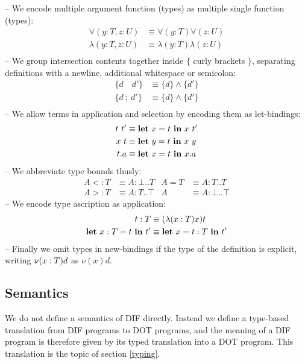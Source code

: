 \noindent -- We encode multiple argument function (types) as multiple single
function (types):
\begin{align*}
    \forall(y: T, z: U) &\equiv \forall(y: T)\forall(z: U) \\
    \lambda(y: T, z: U) &\equiv \lambda(y: T)\lambda(z: U) \\
\end{align*}
\noindent -- We group intersection contents together inside $\{$ curly brackets
$\}$, separating definitions with a newline, additional whitespace or semicolon:
\begin{align*}
    \{d \quad d'\} &\equiv \{d\} \wedge \{d'\} \\
    \{d \ ;\  d'\} &\equiv \{d\} \wedge \{d'\} \\
\end{align*}
\noindent -- We allow terms in application and selection by encoding them as
let-bindings:
\begin{align*}
    t\ t' &\equiv \textbf{let}\ x = t\ \textbf{in}\ x\ t' \\
    x\ t &\equiv \textbf{let}\ y = t\ \textbf{in}\ x\ y \\
    t.a &\equiv \textbf{let}\ x = t\ \textbf{in}\ x.a
\end{align*}
\noindent -- We abbreviate type bounds thusly:
\begin{align*}
    A <: T &\equiv A: \bot..T & A = T &\equiv A: T..T \\
    A >: T &\equiv A: T..\top & A &\equiv A: \bot..\top
\end{align*}
\noindent -- We encode type ascription as application:
\begin{align*}
    t: T &\equiv (\lambda(x:T)x)t \\
    \textbf{let}\ x: T = t\ \textbf{in}\ t' &\equiv \textbf{let}\ x = t: T\ \textbf{in}\ t'
\end{align*}
\noindent -- Finally we omit types in new-bindings if the type of the definition
is explicit, writing $\nu(x:T)d$ as $\nu(x)d$.

\subsection{Semantics}
We do not define a semantics of DIF directly. Instead we define a type-based
translation from DIF programs to DOT programs, and the meaning of a DIF program
is therefore given by its typed translation into a DOT program. This
translation is the topic of section \ref{typing}.
